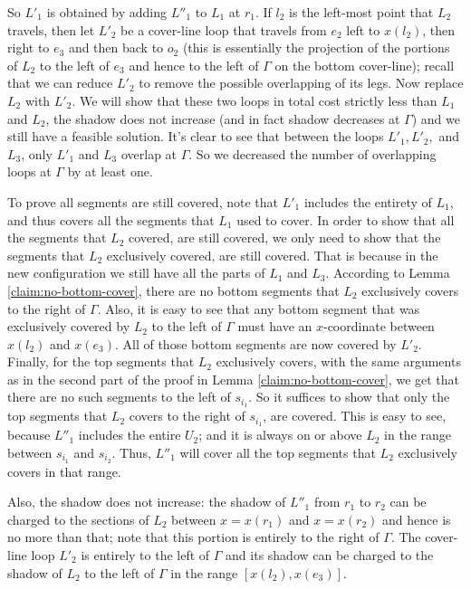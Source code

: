 \documentclass[pdflatex,sn-mathphys-num]{sn-jnl}
\theoremstyle{thmstyleone}
\begin{document}
    So $L'_1$ is obtained by adding $L''_1$ to $L_1$ at $r_1$.
    If $l_2$ is the left-most point that $L_2$ travels, then let
    $L'_2$ be a cover-line loop that travels from $e_2$ left to $x(l_2)$, then right to $e_3$ and then back to $o_2$ (this is essentially the projection of the portions of $L_2$ to the left of $e_3$ and hence to the left of $\Gamma$ on the bottom cover-line); recall that we can reduce $L'_2$ to remove the possible overlapping of its legs.     
     Now replace $L_2$ with $L'_2$. We will show that these two loops in total cost strictly less than $L_1$ and $L_2$, the shadow does not increase (and in fact shadow decreases at $\Gamma$) and we still have a feasible solution. It's clear to see that between the loops $L'_1, L'_2,$ and $L_3$, only $L'_1$ and $L_3$ overlap at $\Gamma$. So we decreased the number of overlapping loops at $\Gamma$ by at least one.
    
    To prove all segments are still covered, note that $L'_1$ includes the entirety of $L_1$, and thus covers all the segments that $L_1$ used to cover. In order to show that all the segments that $L_2$ covered, are still covered, we only need to show that the segments that $L_2$ exclusively covered, are still covered. That is because in the new configuration we still have all the parts of $L_1$ and $L_3$.
    According to Lemma \ref{claim:no-bottom-cover}, there are no bottom segments that $L_2$ exclusively covers to the right of $\Gamma$. Also, it is easy to see that any bottom segment that was exclusively covered by $L_2$ to the left of $\Gamma$ must have an $ x $-coordinate between $x(l_2)$ and $x(e_3)$. All of those bottom segments are now covered by $L'_2$.
    Finally, for the top segments that $L_2$ exclusively covers, with the same arguments as in the second part of the proof in Lemma \ref{claim:no-bottom-cover}, we get that there are no such segments to the left of $s_{i_1}$. So it suffices to show that only the top segments that $L_2$ covers to the right of $s_{i_1}$, are covered. This is easy to see, because $L''_1$ includes the entire $U_2$; and it is always on or above $L_2$ in the range between $s_{i_1}$ and $s_{i_2}$. Thus, $L''_1$ will cover all the top segments that $L_2$ exclusively covers in that range.
    
    Also, the shadow does not increase: the shadow of $L''_1$ from $r_1$ to $r_2$ can be charged to the sections
    of $L_2$ between $x=x(r_1)$ and $x=x(r_2)$ and hence is no more than that; note that this portion is entirely to the right of $\Gamma$. The cover-line loop $L'_2$ is entirely to the left of $\Gamma$ and its shadow can be charged to the shadow of $L_2$ to the left of $\Gamma$ in the range $[x(l_2), x(e_3)]$. 
    
\end{document}
